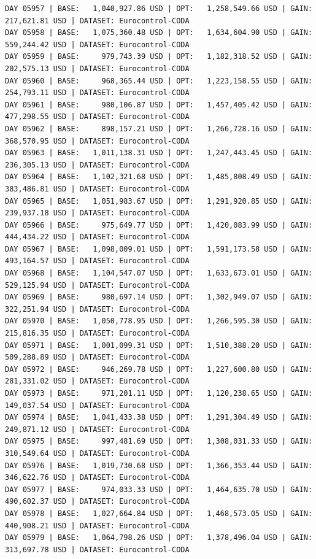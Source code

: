 \documentclass[11pt,a4paper]{article}
\begin{document}
\begin{verbatim}
DAY 05957 | BASE:   1,040,927.86 USD | OPT:   1,258,549.66 USD | GAIN: 217,621.81 USD | DATASET: Eurocontrol-CODA
DAY 05958 | BASE:   1,075,360.48 USD | OPT:   1,634,604.90 USD | GAIN: 559,244.42 USD | DATASET: Eurocontrol-CODA
DAY 05959 | BASE:     979,743.39 USD | OPT:   1,182,318.52 USD | GAIN: 202,575.13 USD | DATASET: Eurocontrol-CODA
DAY 05960 | BASE:     968,365.44 USD | OPT:   1,223,158.55 USD | GAIN: 254,793.11 USD | DATASET: Eurocontrol-CODA
DAY 05961 | BASE:     980,106.87 USD | OPT:   1,457,405.42 USD | GAIN: 477,298.55 USD | DATASET: Eurocontrol-CODA
DAY 05962 | BASE:     898,157.21 USD | OPT:   1,266,728.16 USD | GAIN: 368,570.95 USD | DATASET: Eurocontrol-CODA
DAY 05963 | BASE:   1,011,138.31 USD | OPT:   1,247,443.45 USD | GAIN: 236,305.13 USD | DATASET: Eurocontrol-CODA
DAY 05964 | BASE:   1,102,321.68 USD | OPT:   1,485,808.49 USD | GAIN: 383,486.81 USD | DATASET: Eurocontrol-CODA
DAY 05965 | BASE:   1,051,983.67 USD | OPT:   1,291,920.85 USD | GAIN: 239,937.18 USD | DATASET: Eurocontrol-CODA
DAY 05966 | BASE:     975,649.77 USD | OPT:   1,420,083.99 USD | GAIN: 444,434.22 USD | DATASET: Eurocontrol-CODA
DAY 05967 | BASE:   1,098,009.01 USD | OPT:   1,591,173.58 USD | GAIN: 493,164.57 USD | DATASET: Eurocontrol-CODA
DAY 05968 | BASE:   1,104,547.07 USD | OPT:   1,633,673.01 USD | GAIN: 529,125.94 USD | DATASET: Eurocontrol-CODA
DAY 05969 | BASE:     980,697.14 USD | OPT:   1,302,949.07 USD | GAIN: 322,251.94 USD | DATASET: Eurocontrol-CODA
DAY 05970 | BASE:   1,050,778.95 USD | OPT:   1,266,595.30 USD | GAIN: 215,816.35 USD | DATASET: Eurocontrol-CODA
DAY 05971 | BASE:   1,001,099.31 USD | OPT:   1,510,388.20 USD | GAIN: 509,288.89 USD | DATASET: Eurocontrol-CODA
DAY 05972 | BASE:     946,269.78 USD | OPT:   1,227,600.80 USD | GAIN: 281,331.02 USD | DATASET: Eurocontrol-CODA
DAY 05973 | BASE:     971,201.11 USD | OPT:   1,120,238.65 USD | GAIN: 149,037.54 USD | DATASET: Eurocontrol-CODA
DAY 05974 | BASE:   1,041,433.38 USD | OPT:   1,291,304.49 USD | GAIN: 249,871.12 USD | DATASET: Eurocontrol-CODA
DAY 05975 | BASE:     997,481.69 USD | OPT:   1,308,031.33 USD | GAIN: 310,549.64 USD | DATASET: Eurocontrol-CODA
DAY 05976 | BASE:   1,019,730.68 USD | OPT:   1,366,353.44 USD | GAIN: 346,622.76 USD | DATASET: Eurocontrol-CODA
DAY 05977 | BASE:     974,033.33 USD | OPT:   1,464,635.70 USD | GAIN: 490,602.37 USD | DATASET: Eurocontrol-CODA
DAY 05978 | BASE:   1,027,664.84 USD | OPT:   1,468,573.05 USD | GAIN: 440,908.21 USD | DATASET: Eurocontrol-CODA
DAY 05979 | BASE:   1,064,798.26 USD | OPT:   1,378,496.04 USD | GAIN: 313,697.78 USD | DATASET: Eurocontrol-CODA

\end{verbatim}
\end{document}

